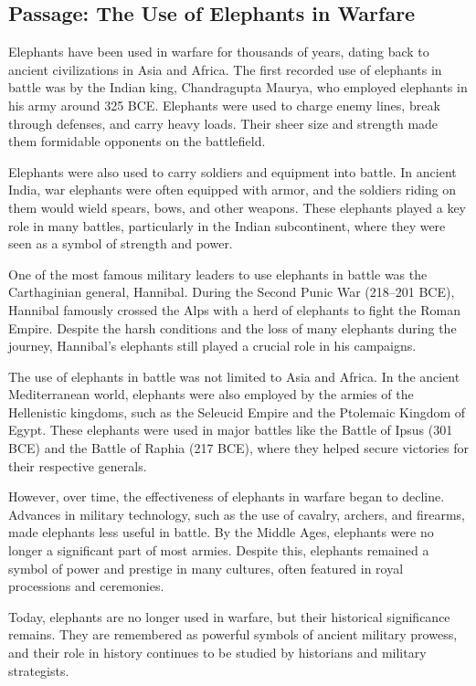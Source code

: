 \documentclass[12pt]{article}
\begin{document}
\onehalfspacing

\subsection*{Passage: The Use of Elephants in Warfare}

\begin{tcolorbox}[colframe=black!40, colback=gray!5]
\begin{spacing}{1.15}
    Elephants have been used in warfare for thousands of years, dating back to ancient civilizations in Asia and Africa. The first recorded use of elephants in battle was by the Indian king, Chandragupta Maurya, who employed elephants in his army around 325 BCE. Elephants were used to charge enemy lines, break through defenses, and carry heavy loads. Their sheer size and strength made them formidable opponents on the battlefield.

    Elephants were also used to carry soldiers and equipment into battle. In ancient India, war elephants were often equipped with armor, and the soldiers riding on them would wield spears, bows, and other weapons. These elephants played a key role in many battles, particularly in the Indian subcontinent, where they were seen as a symbol of strength and power.

    One of the most famous military leaders to use elephants in battle was the Carthaginian general, Hannibal. During the Second Punic War (218–201 BCE), Hannibal famously crossed the Alps with a herd of elephants to fight the Roman Empire. Despite the harsh conditions and the loss of many elephants during the journey, Hannibal's elephants still played a crucial role in his campaigns.

    The use of elephants in battle was not limited to Asia and Africa. In the ancient Mediterranean world, elephants were also employed by the armies of the Hellenistic kingdoms, such as the Seleucid Empire and the Ptolemaic Kingdom of Egypt. These elephants were used in major battles like the Battle of Ipsus (301 BCE) and the Battle of Raphia (217 BCE), where they helped secure victories for their respective generals.

    However, over time, the effectiveness of elephants in warfare began to decline. Advances in military technology, such as the use of cavalry, archers, and firearms, made elephants less useful in battle. By the Middle Ages, elephants were no longer a significant part of most armies. Despite this, elephants remained a symbol of power and prestige in many cultures, often featured in royal processions and ceremonies.

    Today, elephants are no longer used in warfare, but their historical significance remains. They are remembered as powerful symbols of ancient military prowess, and their role in history continues to be studied by historians and military strategists.
\end{spacing}
\end{tcolorbox}
\end{document}
